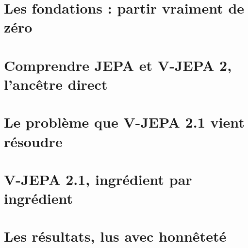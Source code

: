 \documentclass{ml4ebook}     %
\begin{document}
\frontmatter



\cleardoublepage
{}
\tableofcontents

\mainmatter


\part{Les fondations : partir vraiment de zéro}


\part{Comprendre JEPA et V-JEPA 2, l'ancêtre direct}



\part{Le problème que V-JEPA 2.1 vient résoudre}
% 
% 

\part{V-JEPA 2.1, ingrédient par ingrédient}
% 
% 
% 
% 
% 
% 
% 

\part{Les résultats, lus avec honnêteté}
% 
% 
% 
\end{document}
